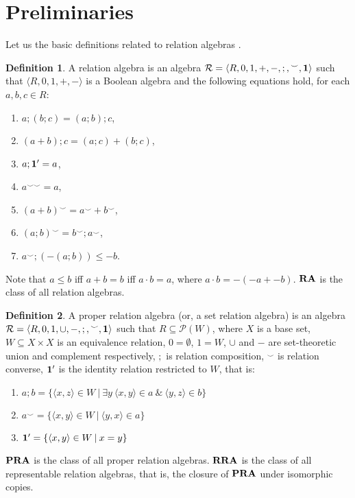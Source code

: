 \documentclass[a4paper]{article}
\theoremstyle{definition}
\newtheorem{definition}{Definition}
\theoremstyle{theorem}
\theoremstyle{proposition}
\theoremstyle{lemma}
\theoremstyle{ex}
\theoremstyle{corollary}
\theoremstyle{claim}
\begin{document}
\section{Preliminaries}

Let us the basic definitions related to relation algebras \cite{hirsch2002relation}.
\begin{definition} A relation algebra is an algebra $\mathcal{R} = \langle R, 0, 1, +, -, ;, {}^{\smile}, {\bf 1 }\rangle$ such that $\langle R, 0, 1, +, - \rangle$ is a Boolean algebra and the following
    equations hold, for each $a, b, c \in R$:
    \begin{enumerate}
      \item $a ; (b ; c) = (a ; b) ; c$,
      \item $(a + b) ; c = (a ; c) + (b ; c)$,
      \item $a ; {\bf 1}' = a$,
      \item $a^{\smile \smile} = a$,
      \item $(a + b)^{\smile} = a^{\smile} + b^{\smile}$,
      \item $(a ; b)^{\smile} = b^{\smile} ; a^{\smile}$,
      \item $a^{\smile} ; (- (a ; b)) \leq - b$.
    \end{enumerate}
    Note that $a \leq b$ iff $a + b = b$ iff $a \cdot b = a$, where $a \cdot b = - (- a + - b)$. ${\bf RA}$ is the class of all relation algebras.
\end{definition}

\begin{definition}
    A proper relation algebra (or, a set relation algebra) is an algebra $\mathcal{R} = \langle R, 0, 1, \cup, -, ;, {}^{\smile}, {\bf 1 }\rangle$ such that $R \subseteq \mathcal{P}(W)$, where $X$ is a base set, $W \subseteq X \times X$ is an equivalence relation, $0 = \emptyset$, $1 = W$, $\cup$ and $-$ are set-theoretic union and complement respectively, $;$ is relation composition, ${}^{\smile}$ is relation converse,
    ${\bf 1}'$ is the identity relation restricted to $W$, that is:
    \begin{enumerate}
    \item $a ; b = \{ \langle x, z \rangle \in W \: | \: \exists y \: \langle x, y \rangle \in a \: \& \: \langle y, z \rangle \in b \}$
    \item $a^{\smile} = \{ \langle x, y \rangle \in W \: | \: \langle y, x \rangle \in a \}$
    \item ${\bf 1}' = \{ \langle x, y \rangle \in W \: | \: x = y \}$
    \end{enumerate}
       ${\bf PRA}$ is the class of all proper relation algebras. ${\bf RRA}$ is the class of all representable relation algebras, that is, the closure of ${\bf PRA}$ under isomorphic copies.
\end{definition}
\end{document}
